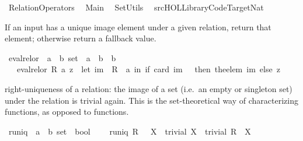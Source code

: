 %
\begin{isabellebody}%
\def\isabellecontext{RelationOperators}%
%
\isamarkuptrue%
%
\isadelimtheory
%
\endisadelimtheory
%
\isatagtheory
{}\isamarkupfalse%
\ RelationOperators\isanewline
{}\isanewline
\ \ Main\isanewline
\ \ SetUtils\isanewline
\ \ {\isachardoublequoteopen}{\isachartilde}{\isachartilde}{\isacharslash}src{\isacharslash}HOL{\isacharslash}Library{\isacharslash}Code{\isacharunderscore}Target{\isacharunderscore}Nat{\isachardoublequoteclose}\isanewline
\isanewline
{}%
\endisatagtheory
{\isafoldtheory}%
%
\isadelimtheory
%
\endisadelimtheory
%
\isamarkuptrue%
%
\begin{isamarkuptext}%
If an input has a unique image element under a given relation, return that element; 
  otherwise return a fallback value.%
\end{isamarkuptext}%
\isamarkuptrue%
\isamarkupfalse%
\ eval{\isacharunderscore}rel{\isacharunderscore}or\ {\isacharcolon}{\isacharcolon}\ {\isachardoublequoteopen}{\isacharparenleft}{\isacharprime}a\ {\isasymtimes}\ {\isacharprime}b{\isacharparenright}\ set\ {\isasymRightarrow}\ {\isacharprime}a\ {\isasymRightarrow}\ {\isacharprime}b\ {\isasymRightarrow}\ {\isacharprime}b{\isachardoublequoteclose}\isanewline
\ \ \ {\isachardoublequoteopen}eval{\isacharunderscore}rel{\isacharunderscore}or\ R\ a\ z\ {\isacharequal}\ {\isacharparenleft}let\ im\ {\isacharequal}\ R\ {\isacharbackquote}{\isacharbackquote}\ {\isacharbraceleft}a{\isacharbraceright}\ in\ if\ card\ im\ {\isacharequal}\ {}\ then\ the{\isacharunderscore}elem\ im\ else\ z{\isacharparenright}{\isachardoublequoteclose}%
\begin{isamarkuptext}%
right-uniqueness of a relation: the image of a  set (i.e.\ an empty or
  singleton set) under the relation is trivial again. 
This is the set-theoretical way of characterizing functions, as opposed to \isa{{\isasymlambda}} functions.%
\end{isamarkuptext}%
\isamarkuptrue%
\isamarkupfalse%
\ runiq\ {\isacharcolon}{\isacharcolon}\ {\isachardoublequoteopen}{\isacharparenleft}{\isacharprime}a\ {\isasymtimes}\ {\isacharprime}b{\isacharparenright}\ set\ {\isasymRightarrow}\ bool{\isachardoublequoteclose}\ \isanewline
\ \ \ {\isachardoublequoteopen}runiq\ R\ {\isacharequal}\ {\isacharparenleft}{\isasymforall}\ X\ {\isachardot}\ trivial\ X\ {\isasymlongrightarrow}\ trivial\ {\isacharparenleft}R\ {\isacharbackquote}{\isacharbackquote}\ X{\isacharparenright}{\isacharparenright}{\isachardoublequoteclose}%

\end{isabellebody}
